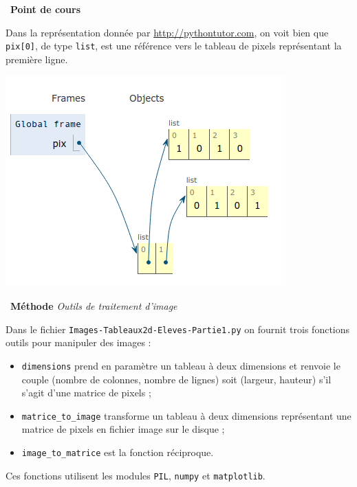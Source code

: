 \documentclass[a4paper, french, 12pt]{article}
\newcounter{cours}
\newenvironment{cours}[1]
{\par \medskip   \addtocounter{cours}{1} \noindent  
\begin{bclogo}[arrondi =0.1,  ombre = true, barre=none, logo=\bcbook, marge=4]{~\textbf{Point de cours} \textbf{\thecours} {\itshape #1} }  \par}
{
\end{bclogo}
 \par \bigskip }
\newenvironment{methode}[1]
{\par \medskip    \noindent  
 \begin {bclogo}[arrondi =0.1,logo=\bcoutil, marge=4,noborder = true] {~\textbf{Méthode}   {\itshape #1} }  \par}
{
\end{bclogo}
 \par \bigskip }
\begin{document}
\begin{cours}{}
Dans la représentation donnée par \href{http://pythontutor.com}{http://pythontutor.com}, on voit bien que \texttt{pix[0]}, de type \texttt{list}, est une référence vers le tableau de pixels représentant la première ligne. 
\begin{center}
\includegraphics[scale=0.8]{images/exemple_binaire_tutor.png}
\end{center}


\end{cours}

\vspace*{-20pt}




\begin{methode}{Outils de traitement d'image}

Dans le fichier \texttt{Images-Tableaux2d-Eleves-Partie1.py} on fournit trois fonctions outils pour manipuler des images :

\begin{itemize}[label=]
	\item \texttt{dimensions} prend en paramètre un tableau à deux dimensions et renvoie le couple (nombre de colonnes, nombre de lignes) soit (largeur, hauteur) s'il s'agit d'une matrice de pixels ;
	\item \texttt{matrice\_to\_image} transforme un tableau à deux dimensions représentant une matrice de pixels en fichier image sur le disque ;
	\item  \texttt{image\_to\_matrice} est la fonction réciproque.
\end{itemize}

Ces fonctions utilisent les modules \texttt{PIL}, \texttt{numpy} et \texttt{matplotlib}.

\end{methode}
\end{document}
